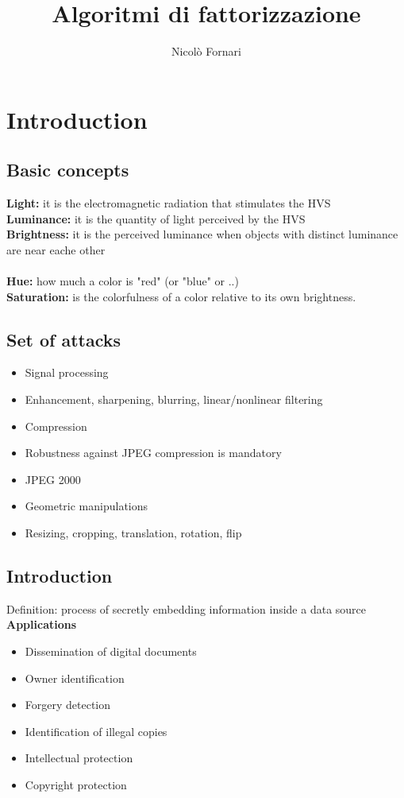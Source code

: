 \documentclass[10pt,a4paper]{book}
\author{Nicolò Fornari}
\title{Algoritmi di fattorizzazione}
\begin{document}
\chapter{Introduction}
\section{Basic concepts}

\textbf{Light:} it is the electromagnetic radiation that stimulates the HVS\\
\textbf{Luminance:} it is the quantity of light perceived by the HVS\\ 
\textbf{Brightness:} it is the perceived luminance when objects with distinct luminance are near eache other\\\\
\textbf{Hue:} how much a color is "red" (or "blue" or ..)\\
\textbf{Saturation:} is the colorfulness of a color relative to its own brightness.

\section{Set of attacks}

\begin{itemize}
\item Signal processing 
\item Enhancement, sharpening, blurring, linear/nonlinear filtering 
\item Compression 
\item Robustness against JPEG compression is mandatory 
\item JPEG 2000 
\item Geometric manipulations 
\item Resizing, cropping, translation, rotation, flip
\end{itemize}

\section{Introduction}
Definition: process of secretly embedding information inside a data source\\

\textbf{Applications}
\begin{itemize}

\item Dissemination of digital documents 
\item Owner identification 
\item Forgery detection 
\item Identification of illegal copies 
\item Intellectual protection
\item Copyright protection
\end{itemize}
\end{document}
